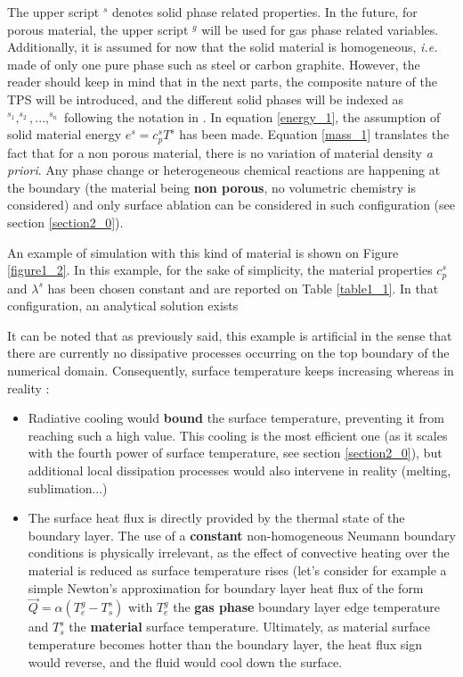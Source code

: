 \documentclass[english,10pt,a4paper,oneside,twocolumn,titlepage]{report}
\begin{document}
	 The upper script $^s$ denotes solid phase related
	 properties. In the future, for porous material, the 
	 upper script $^g$ will be used for gas phase related
	 variables. Additionally, it is assumed for now that
	 the solid material is homogeneous, \textit{i.e.} made
	 of only one pure phase such as steel or carbon graphite.
	 However, the reader should keep in mind that in the
	 next parts, the composite nature of the TPS will be 
	 introduced, and the different solid phases will be 
	 indexed as $^{s_1}, ^{s_2},  ..., ^{s_n}$ following the
	 notation in \cite{Marschall2015}. 
	 In equation \eqref{energy_1}, the assumption of solid 
	 material energy $e^s = c_p^s T^s$ has been made.
	 Equation \eqref{mass_1} translates the fact that for
	 a non porous material, there is no variation of material
	 density \textit{a priori}. 
	 Any phase change or heterogeneous chemical 
	 reactions are 
	 happening at the boundary (the material being \textbf{
	 non porous}, no volumetric chemistry is considered) and
	 only surface ablation can be considered in such 
	 configuration (see section \ref{section2_0}). 
	 
	 An example of simulation with this kind of material is
	 shown on Figure \ref{figure1_2}. In this example, for 
	 the sake of simplicity, the material properties $c_p^s$ 
	 and $\lambda^s$ has been chosen constant and are 
	 reported on Table \ref{table1_1}. In that configuration, 
	 an analytical solution exists \cite{Hahn2012}
	 
	 It can be noted that
	 as previously said, this example is artificial in the sense
	 that there are currently no dissipative processes 
	 occurring on the top boundary of the numerical
	 domain. Consequently, surface temperature 
	 keeps increasing whereas in reality :
	 \begin{itemize}
	 \item Radiative cooling would \textbf{bound}
	  the surface 
	 temperature, preventing it from reaching such a high 
	 value. This cooling is the most efficient one (as it scales
	 with the fourth power of surface temperature, see 
	 section \ref{section2_0}), but additional local dissipation
	 processes would also intervene in reality (melting,
	  sublimation...)
	  \item The surface heat flux is directly provided by the 
	  thermal state of the boundary layer. The use of a 
	  \textbf{constant} non-homogeneous 
	  Neumann boundary 
	  conditions is physically irrelevant, as the effect of
	  convective heating over the material is reduced as 
	  surface temperature rises (let's consider for example
	  a simple Newton's approximation for boundary layer
	  heat flux of the form $ \overrightarrow{Q}
	   = \alpha \left(T^g_{e} - T^s_{s} \right) $ 
	   with $T^g_{e} $ the \textbf{gas
	  phase} boundary layer edge temperature and $T^s_{s}
	  $ the \textbf{material} surface temperature. Ultimately, 
	  as material surface temperature becomes hotter than
	  the boundary layer, the heat flux sign would reverse, 
	  and the fluid would cool down the surface.
	 \end{itemize} 
	
\end{document}

